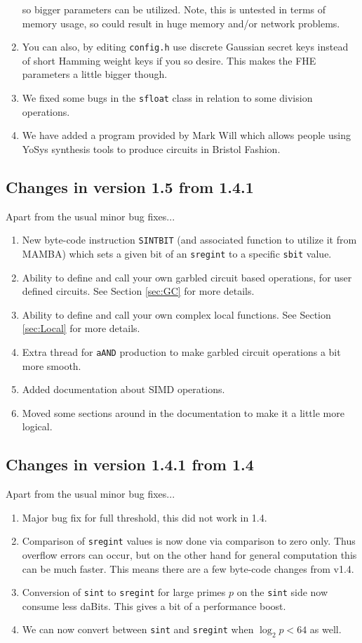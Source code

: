 \begin{enumerate}
so bigger parameters can be utilized. Note, this is untested
in terms of memory usage, so could result in huge memory
and/or network problems.
\item You can also, by editing \verb|config.h| use discrete Gaussian
secret keys instead of short Hamming weight keys if you so desire.
This makes the FHE parameters a little bigger though.
\item We fixed some bugs in the \verb|sfloat| class in relation to
some division operations.
\item We have added a program provided by Mark Will which allows
people using YoSys synthesis tools to produce circuits in Bristol
Fashion.
\end{enumerate}


\subsection{Changes in version 1.5 from 1.4.1}
Apart from the usual minor bug fixes...
\begin{enumerate}
\item New byte-code instruction \verb+SINTBIT+ (and associated function
to utilize it from MAMBA) which sets a given bit of an \verb|sregint|
to a specific \verb|sbit| value.
\item Ability to define and call your own garbled circuit based operations,
for user defined circuits.
See Section \ref{sec:GC} for more details.
\item Ability to define and call your own complex local functions.
See Section \ref{sec:Local} for more details.
\item Extra thread for \verb|aAND| production to make garbled circuit
operations a bit more smooth.
\item Added documentation about SIMD operations.
\item Moved some sections around in the documentation to make it
a little more logical.
\end{enumerate}


\subsection{Changes in version 1.4.1 from 1.4}
Apart from the usual minor bug fixes...
\begin{enumerate}
\item Major bug fix for full threshold, this did not work in 1.4.
\item Comparison of \verb|sregint| values is now done via comparison
	to zero only. Thus overflow errors can occur, but on the other
	hand for general computation this can be much faster.
        This means there are a few byte-code changes from v1.4.
\item Conversion of \verb|sint| to \verb|sregint| for large primes $p$
	on the \verb|sint| side now consume less daBits. This gives
	a bit of a performance boost.
\item We can now convert between \verb|sint| and \verb|sregint|
      when $\log_2 p <64$ as well.
\end{enumerate}


